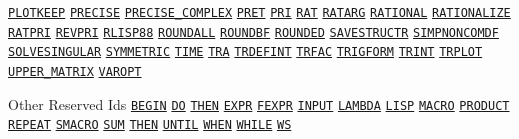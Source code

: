 \begin{list}{}
\hyperlink{switch:PLOTKEEP}{\texttt{PLOTKEEP}}
\hyperlink{switch:PRECISE}{\texttt{PRECISE}}
\hyperlink{switch:PRECISE_COMPLEX}{\texttt{PRECISE\_COMPLEX}}
\hyperlink{switch:PRET}{\texttt{PRET}}
\hyperlink{switch:PRI}{\texttt{PRI}}
\hyperlink{switch:RAT}{\texttt{RAT}}
\hyperlink{switch:RATARG}{\texttt{RATARG}}
\hyperlink{switch:RATIONAL}{\texttt{RATIONAL}}
\hyperlink{switch:RATIONALIZE}{\texttt{RATIONALIZE}}
\hyperlink{switch:RATPRI}{\texttt{RATPRI}}
\hyperlink{switch:REVPRI}{\texttt{REVPRI}}
\hyperlink{switch:RLISP88}{\texttt{RLISP88}}
\hyperlink{switch:ROUNDALL}{\texttt{ROUNDALL}}
\hyperlink{switch:ROUNDBF}{\texttt{ROUNDBF}}
\hyperlink{switch:ROUNDED}{\texttt{ROUNDED}}
\hyperlink{switch:SAVESTRUCTR}{\texttt{SAVESTRUCTR}}
\hyperlink{switch:SIMPNONCOMDF}{\texttt{SIMPNONCOMDF}}
\hyperlink{switch:SOLVESINGULAR}{\texttt{SOLVESINGULAR}}
\hyperlink{switch:SYMMETRIC}{\texttt{SYMMETRIC}}
\hyperlink{switch:TIME}{\texttt{TIME}}
\hyperlink{switch:TRA}{\texttt{TRA}}
\hyperlink{switch:TRDEFINT}{\texttt{TRDEFINT}}
\hyperlink{switch:TRFAC}{\texttt{TRFAC}}
\hyperlink{switch:TRIGFORM}{\texttt{TRIGFORM}}
\hyperlink{switch:TRINT}{\texttt{TRINT}}
\hyperlink{switch:TRPLOT}{\texttt{TRPLOT}}
\hyperlink{switch:UPPER_MATRIX}{\texttt{UPPER\_MATRIX}}
\hyperlink{switch:VAROPT}{\texttt{VAROPT}}
\halfinterwordspace

\item[Other Reserved Ids]\doubleinterwordspace
\hyperlink{command:BEGIN}{\texttt{BEGIN}}
\hyperlink{reserved:DO}{\texttt{DO}}
\hyperlink{reserved:THEN}{\texttt{THEN}}
\hyperlink{reserved:EXPR}{\texttt{EXPR}}
\hyperlink{reserved:FEXPR}{\texttt{FEXPR}}
\hyperlink{reserved:INPUT}{\texttt{INPUT}}
\hyperlink{reserved:LAMBDA}{\texttt{LAMBDA}}
\hyperlink{reserved:LISP}{\texttt{LISP}}
\hyperlink{reserved:MACRO}{\texttt{MACRO}}
\hyperlink{reserved:PRODUCT}{\texttt{PRODUCT}}
\hyperlink{command:REPEAT}{\texttt{REPEAT}}
\hyperlink{reserved:SMACRO}{\texttt{SMACRO}}
\hyperlink{reserved:SUM}{\texttt{SUM}}
\hyperlink{reserved:THEN}{\texttt{THEN}}
\hyperlink{reserved:UNTIL}{\texttt{UNTIL}}
\hyperlink{reserved:WHEN}{\texttt{WHEN}}
\hyperlink{command:WHILE}{\texttt{WHILE}}
\hyperlink{reserved:WS}{\texttt{WS}}
\halfinterwordspace

\end{list}
